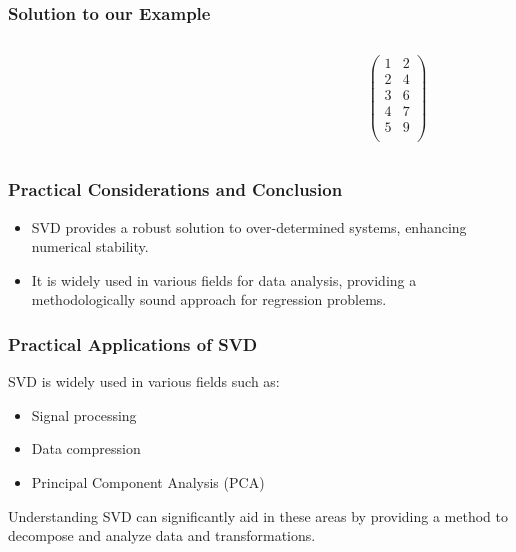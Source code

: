 \documentclass[aspectratio=169]{beamer}
\begin{document}
\begin{frame}
\frametitle{Solution to our Example}
\begin{columns}
    \begin{column}{0.5\textwidth}
    \end{column}
    \begin{column}{0.5\textwidth}
        \[ \qquad \qquad \qquad
        \begin{pmatrix}
        1 & 2 \\
        2 & 4 \\
        3 & 6 \\
        4 & 7 \\
        5 & 9 \\
        \end{pmatrix}
        \]
    \end{column}
\end{columns}
\end{frame}

\begin{frame}
\frametitle{Practical Considerations and Conclusion}
\begin{itemize}
    \item SVD provides a robust solution to over-determined systems, enhancing numerical stability.
    \item It is widely used in various fields for data analysis, providing a methodologically sound approach for regression problems.
\end{itemize}
\end{frame}


\begin{frame}
\frametitle{Practical Applications of SVD}
SVD is widely used in various fields such as:
\begin{itemize}
    \item Signal processing
    \item Data compression
    \item Principal Component Analysis (PCA)
\end{itemize}
Understanding SVD can significantly aid in these areas by providing a method to decompose and analyze data and transformations.
\end{frame}
\end{document}
